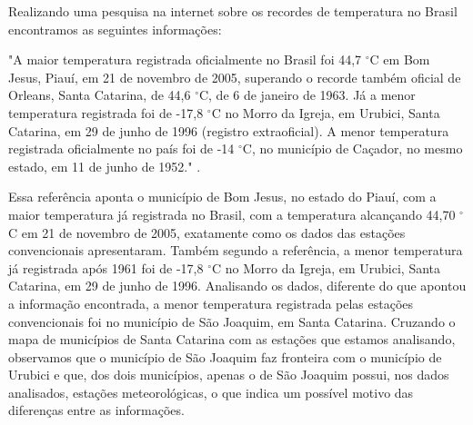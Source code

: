 Realizando uma pesquisa na internet sobre os recordes de temperatura no Brasil encontramos as seguintes informações: 

\begin{displayquote}
"A maior temperatura registrada oficialmente no Brasil foi 44,7 $^{\circ}$C em Bom Jesus, Piauí, em 21 de novembro de 2005, superando o recorde também oficial de Orleans, Santa Catarina, de 44,6 $^{\circ}$C, de 6 de janeiro de 1963. Já a menor temperatura registrada foi de -17,8 $^{\circ}$C no Morro da Igreja, em Urubici, Santa Catarina, em 29 de junho de 1996 (registro extraoficial). A menor temperatura registrada oficialmente no país foi de -14 $^{\circ}$C, no município de Caçador, no mesmo estado, em 11 de junho de 1952." \cite{wiki:clima_do_brasil}.
\end{displayquote}

Essa referência aponta o município de Bom Jesus, no estado do Piauí, com a maior temperatura já registrada no Brasil, com a temperatura alcançando 44,70 $^{\circ}$C em 21 de novembro de 2005, exatamente como os dados das estações convencionais apresentaram.  Também segundo a referência, a menor temperatura já registrada após 1961 foi de -17,8 $^{\circ}$C no Morro da Igreja, em Urubici, Santa Catarina, em 29 de junho de 1996. Analisando os dados, diferente do que apontou a informação encontrada, a menor temperatura registrada pelas estações convencionais foi no município de São Joaquim, em Santa Catarina. Cruzando o mapa de municípios de Santa Catarina com as estações que estamos analisando, observamos que o município de São Joaquim faz fronteira com o município de Urubici e que, dos dois municípios, apenas o de São Joaquim possui, nos dados analisados, estações meteorológicas, o que indica um possível motivo das diferenças entre as informações.

\renewcommand{\cleardoublepage}{}
\renewcommand{\clearpage}{}
\vspace{5mm}